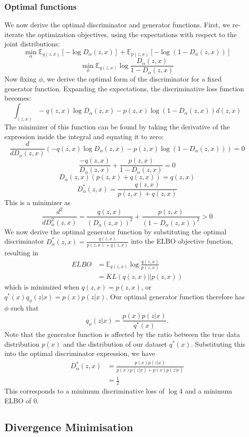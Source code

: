 \documentclass[a4paper,12pt]{article}
\numberwithin{equation}{section}
\begin{document}
\subsubsection{Optimal functions}
We now derive the optimal discriminator and generator functions. First, we re-iterate the optimization objectives, using the expectations with respect to the joint distributions:
\[\min_\alpha \mathbb{E}_{q(z,x)}[-\log D_\alpha(z, x)]+\mathbb{E}_{p(z,x)}[-\log (1-D_\alpha(z,x))]\]
\[\min_\phi \mathbb{E}_{q(z,x)}\log\frac{D_\alpha(z,x)}{1-D_\alpha(z,x)}\]
Now fixing $\phi$, we derive the optimal form of the discriminator for a fixed generator function. Expanding the expectations, the discriminative loss function becomes:
\[\int_{(z,x)}-q(z,x)\log D_\alpha(z,x)-p(z,x)\log(1-D_\alpha(z,x))d(z,x)\]
The minimizer of this function can be found by taking the derivative of the expression inside the integral and equating it to zero:
\[\frac{d}{d D_\alpha(z,x)}\left(-q(z,x)\log D_\alpha(z,x)-p(z,x)\log (1-D_\alpha (z,x))\right)=0\]
\[\frac{-q(z,x)}{D_\alpha(z,x)}+\frac{p(z,x)}{1-D_\alpha(z,x)}=0\]
\[D_\alpha(z,x)(p(z,x)+q(z,x))=q(z,x)\]
\[D_\alpha^*(z,x)=\frac{q(z,x)}{p(z,x)+q(z,x)}\]
This is a minimizer as
\[\frac{d^2}{dD^2_\alpha(z,x)}=\frac{q(z,x)}{(D_\alpha(z,x))^2}+\frac{p(z,x)}{(1-D_\alpha(z,x))^2}>0\]
We now derive the optimal generator function by substituting the optimal discriminator $D_\alpha^*(z,x)=\frac{q(z,x)}{p(z,x)+q(z,x)}$ into the ELBO objective function, resulting in
\begin{align*}
ELBO &= \mathbb{E}_{q(z,x)}\log\frac{q(z,x)}{p(z,x)}\\
&=KL(q(z,x)||p(z,x))
\end{align*}
which is minimized when $q(z,x)=p(z,x)$, or $q^*(x)q_\phi(z|x)=p(x)p(z|x)$. Our optimal generator function therefore has $\phi$ such that
\[q_\phi(z|x)=\frac{p(x)p(z|x)}{q^*(x)}.\]
Note that the generator function is affected by the ratio between the true data distribution $p(x)$ and the distribution of our dataset $q^*(x)$. Substituting this into the optimal discriminator expression, we have
\begin{align*}
D^*_\alpha(z,x)&=\frac{p(x)p(z|x)}{p(x)p(z|x)+p(x)p(z|x)}\\
&=\frac{1}{2}
\end{align*}
This corresponds to a minimum discriminative loss of $\log 4$ and a minimum ELBO of $0$.
\newpage
\subsection{Divergence Minimisation}
\end{document}
